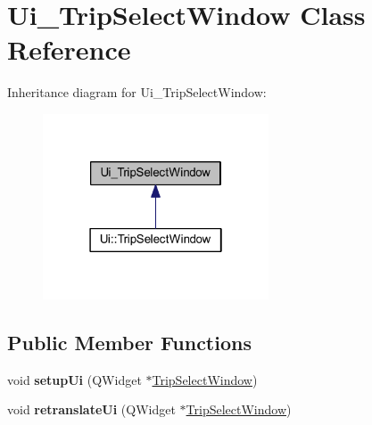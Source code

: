 \hypertarget{class_ui___trip_select_window}{}\section{Ui\+\_\+\+Trip\+Select\+Window Class Reference}
\label{class_ui___trip_select_window}


Inheritance diagram for Ui\+\_\+\+Trip\+Select\+Window\+:\nopagebreak
\begin{figure}[H]
\begin{center}
\leavevmode
\includegraphics[width=190pt]{class_ui___trip_select_window__inherit__graph}
\end{center}
\end{figure}
\subsection*{Public Member Functions}
\begin{DoxyCompactItemize}
\item 
\mbox{\label{class_ui___trip_select_window_a47ee60f06008cb11a0a3dad75c8b590a}} 
void {\bfseries setup\+Ui} (Q\+Widget $\ast$\mbox{\hyperlink{class_trip_select_window}{Trip\+Select\+Window}})
\item 
\mbox{\label{class_ui___trip_select_window_af5189c690cd2559642deb2becb3f362e}} 
void {\bfseries retranslate\+Ui} (Q\+Widget $\ast$\mbox{\hyperlink{class_trip_select_window}{Trip\+Select\+Window}})
\end{DoxyCompactItemize}
